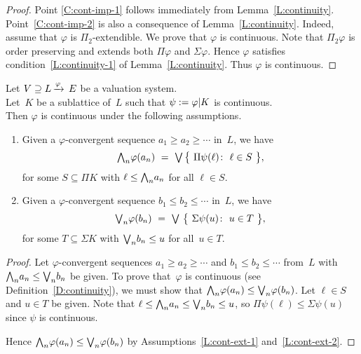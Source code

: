 \documentclass[main.tex]{subfiles}
\begin{document}
\begin{proof}
Point \ref{C:cont-imp-1}
follows immediately from Lemma~\ref{L:continuity}.
Point~\ref{C:cont-imp-2} is also
a consequence of Lemma~\ref{L:continuity}.
Indeed, 
assume that $\varphi$ is $\Pi_2$-extendible.
We prove that $\varphi$ is continuous.
Note that $\Pi_2 \varphi$
is order preserving and
extends both $\Pi\varphi$ and $\Sigma\varphi$.
Hence $\varphi$ satisfies condition~\ref{L:continuity-1}
of Lemma~\ref{L:continuity}.
Thus $\varphi$ is continuous.
\end{proof}
%
%
\begin{lem}
\label{L:cont-ext}
Let $V \supseteq L\,\smash{\xrightarrow{\varphi}\,E}$
be a valuation system.\\
Let~$K$ be a sublattice of~$L$
such that $\psi := \varphi | K$
is continuous.\\
Then $\varphi$ is continuous
under the following assumptions.
\begin{enumerate}
\item\label{L:cont-ext-1}
Given a $\varphi$-convergent sequence $a_1 \geq a_2 \geq \dotsb$ 
in~$L$, we have
\begin{equation*}
\bw_n \varphi(a_n) \ = \ 
\bv\,\bigl\{\ \Pi \psi(\ell) \colon\ 
 \ell \in S \ \bigr\},
\end{equation*}
for some $S\subseteq \Pi K$
with $\ell \leq \textstyle{\bigwedge}_n a_n$ for all $\ell \in S$.

\item\label{L:cont-ext-2}
Given a 
$\varphi$-convergent sequence 
$b_1 \leq b_2 \leq \dotsb$ in~$L$,
we have
\begin{equation*}
\textstyle{\bigvee}_n \varphi(b_n) \ = 
\ \textstyle{\bigvee} \ \bigl\{ \ \Sigma\psi(u) \colon \ u \in T\ \bigr\},
\end{equation*}
for some $T\subseteq \Sigma K$ with $\textstyle{\bigvee}_n b_n \leq u$
for all~$u\in T$.
\end{enumerate}
\end{lem}
\begin{proof}
Let $\varphi$-convergent sequences $a_1 \geq a_2 \geq \dotsb$
and $b_1 \leq b_2 \leq \dotsb$ from~$L$ 
with $\textstyle{\bigwedge}_n a_n \leq \textstyle{\bigvee}_n b_n$ be given.
To prove that~$\varphi$
is continuous
(see Definition~\ref{D:continuity}),
we must show that $\textstyle{\bigwedge}_n \varphi(a_n) \leq \textstyle{\bigvee}_n \varphi(b_n)$.
Let $\ell\in S$ and $u\in T$
be given.
Note that 
$\ell \leq \textstyle{\bigwedge}_n a_n \leq \textstyle{\bigvee}_n b_n \leq u$,
so
$\Pi\psi(\ell) \leq \Sigma\psi (u)$
since $\psi$ is continuous.

Hence $\textstyle{\bigwedge}_n \varphi(a_n) \leq \textstyle{\bigvee}_n \varphi(b_n)$
by Assumptions~\ref{L:cont-ext-1}
and~\ref{L:cont-ext-2}.
\end{proof}
%
%
\end{document}
